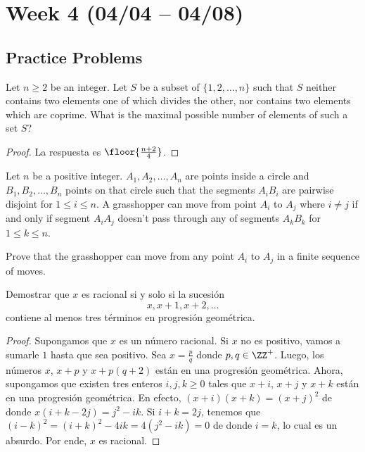 \section{Week 4 (04/04 -- 04/08)}

\subsection{Practice Problems}

\begin{probMR}[Balkan MO 2005/4]
	Let $n\ge 2$ be an integer. Let $S$ be a subset of $\{1,2,\dots,n\}$ such that $S$ neither contains two elements one of which divides the other, nor contains two elements which are coprime. What is the maximal possible number of elements of such a set $S$?
\end{probMR}

\begin{proof}
	La respuesta es $\floor{\frac{n+2}{4}}$.
\end{proof}

\begin{probMB}[Croatian MO 2018/5]
	Let $n$ be a positive integer. $A_1,A_2,\dots,A_n$ are points inside a circle and $B_1,B_2,\dots,B_n$ points on that circle such that the segments $A_iB_i$ are pairwise disjoint for $1\le i\le n$. A grasshopper can move from point $A_i$ to $A_j$ where $i\ne j$ if and only if segment $A_iA_j$ doesn't pass through any of segments $A_kB_k$ for $1\le k\le n$.

	Prove that the grasshopper can move from any point $A_i$ to $A_j$ in a finite sequence of moves.
\end{probMB}

\begin{probEG}
	Demostrar que $x$ es racional si y solo si la sucesión
	\[x,x+1,x+2,\dots\]
	contiene al menos tres términos en progresión geométrica.
\end{probEG}

\begin{proof}
	Supongamos que $x$ es un número racional. Si $x$ no es positivo, vamos a sumarle $1$ hasta que sea positivo. Sea $x=\frac pq$ donde $p,q\in\ZZ^+$. Luego, los números $x$, $x+p$ y $x+p(q+2)$ están en una progresión geométrica. Ahora, supongamos que existen tres enteros $i,j,k\ge 0$ tales que $x+i$, $x+j$ y $x+k$ están en una progresión geométrica. En efecto, $(x+i)(x+k)=(x+j)^2$ de donde $x(i+k-2j)=j^2-ik$. Si $i+k=2j$, tenemos que $(i-k)^2=(i+k)^2-4ik=4(j^2-ik)=0$ de donde $i=k$, lo cual es un absurdo. Por ende, $x$ es racional.
\end{proof}

